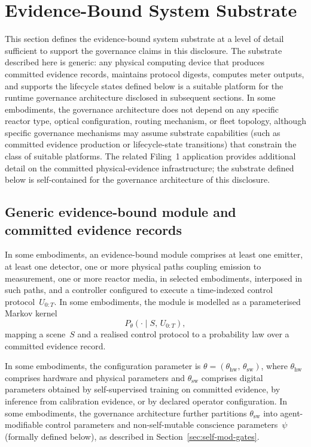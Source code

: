 \documentclass[a4paper,12pt]{article}
\begin{document}
\section{Evidence-Bound System Substrate}
\label{sec:substrate}

This section defines the evidence-bound system substrate at a level of
detail sufficient to support the governance claims in this disclosure.
The substrate described here is generic: any physical computing device
that produces committed evidence records, maintains protocol digests,
computes meter outputs, and supports the lifecycle states defined
below is a suitable platform for the runtime governance architecture
disclosed in subsequent sections. In some embodiments, the governance
architecture does not depend on any specific reactor type, optical
configuration, routing mechanism, or fleet topology, although specific
governance mechanisms may assume substrate capabilities (such as
committed evidence production or lifecycle-state transitions) that
constrain the class of suitable platforms. The related Filing~1 application provides additional detail on the
committed physical-evidence infrastructure; the substrate defined
below is self-contained for the governance architecture of this
disclosure.

\subsection{Generic evidence-bound module and committed evidence
  records}
\label{sec:generic-module}

In some embodiments, an evidence-bound module comprises at least one
emitter, at least one detector, one or more physical paths coupling
emission to measurement, one or more reactor media, in selected embodiments,
interposed in such paths, and a controller configured to execute a
time-indexed control protocol~$U_{0:T}$. In some embodiments, the
module is modelled as a parameterised Markov kernel
\[
  P_{\theta}(\cdot \mid S,\, U_{0:T}),
\]
mapping a scene~$S$ and a realised control protocol to a probability
law over a committed evidence record.

In some embodiments, the configuration parameter is
$\theta = (\theta_{\mathrm{hw}},\, \theta_{\mathrm{sw}})$, where
$\theta_{\mathrm{hw}}$ comprises hardware and physical parameters and
$\theta_{\mathrm{sw}}$ comprises digital parameters obtained by
self-supervised training on committed evidence, by inference from
calibration evidence, or by declared operator configuration. In some
embodiments, the governance architecture further partitions
$\theta_{\mathrm{sw}}$ into agent-modifiable control parameters and
non-self-mutable conscience parameters~$\psi$ (formally defined
below), as described in Section~\ref{sec:self-mod-gates}.
\end{document}
